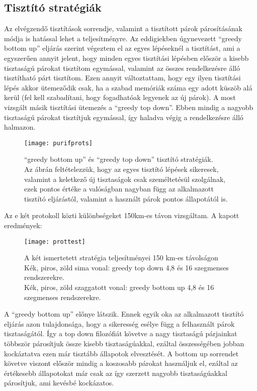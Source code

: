 \subsection{Tisztító stratégiák}
Az elvégzendő tisztítások sorrendje, valamint a tisztított párok párosításának módja is hatással lehet a teljesítményre. Az eddigiekben úgynevezett ``greedy bottom up'' eljárás szerint végeztem el az egyes lépéseknél a tisztítást, ami a egyszerűen annyit jelent, hogy minden egyes tisztítási lépésben először a kisebb tisztaságú párokat tisztítom egymással, valamint az összes rendelkezésre álló tisztítható párt tisztítom. Ezen annyit változtattam, hogy egy ilyen tisztítási lépés akkor ütemeződik csak, ha a szabad memóriák száma egy adott küszöb alá kerül (fel kell szabadítani, hogy fogadhatóak legyenek az új párok). A most vizsgált másik tisztítási ütemezés a ``greedy top down''. Ebben mindig a nagyobb tisztaságú párokat tisztítjuk egymással, így haladva végig a rendelkezésre álló halmazon.
\begin{figure}[H]
\centering
\texttt{[image: purifprots]}
\caption[Tisztító stratégiák]
{``greedy bottom up'' és ``greedy top down'' tisztító stratégiák.\\
Az ábrán feltételezzük, hogy az egyes tisztító lépések sikeresek, valamint a keletkező új tisztaságok csak személtetésül szolgálnak, ezek pontos értéke a valóságban nagyban függ az alkalmazott tisztító eljárástól, valamint a használt párok pontos állapotától is.}
\end{figure}
Az e két protokoll közti különbségeket 150km-es távon vizsgáltam.
A kapott eredmények:
\begin{figure}[H]
\centering
\texttt{[image: prottest]}
\caption[Tisztító stratégiák]
{A két ismertetett stratégia teljesítményei 150 km-es távolságon \\
Kék, piros, zöld sima vonal: greedy top down 4,8 és 16 szegmenses rendszerekre. \\
Kék, piros, zöld szaggatott vonal: greedy bottom up 4,8 és 16 szegmenses rendszerekre.
}
\end{figure}
A ``greedy bottom up'' előnye látszik. Ennek egyik oka az alkalmazott tisztító eljárás azon tulajdonsága, hogy a sikeresség esélye függ a felhasznált párok tisztaságától. Így a top down filozófiát követve a nagy tisztaságú párjainkat többször párosítjuk össze kisebb tisztaságúakkal, ezáltal összességében jobban kockáztatva ezen már tisztább állapotok elvesztését. A bottom up sorrendet követve viszont először mindig a koszosabb párokat használjuk el, ezáltal az értékesebb állapotokat már csak az így szerzett nagyobb tisztaságúakkal párosítjuk, ami kevésbé kockázatos.
